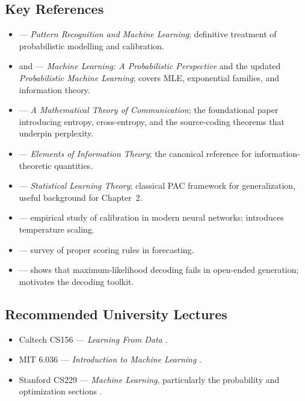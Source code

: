 \subsection{Key References}

\begin{itemize}
  \item \citet{bishop2006prml} --- \emph{Pattern Recognition and Machine Learning}; definitive treatment of probabilistic modelling and calibration.
  \item \citet{murphy2012mlpp} and \citet{murphy2022pml} --- \emph{Machine Learning: A Probabilistic Perspective} and the updated \emph{Probabilistic Machine Learning}; covers MLE, exponential families, and information theory.
  \item \citet{shannon1948} --- \emph{A Mathematical Theory of Communication}; the foundational paper introducing entropy, cross-entropy, and the source-coding theorems that underpin perplexity.
  \item \citet{cover2006elements} --- \emph{Elements of Information Theory}; the canonical reference for information-theoretic quantities.
  \item \citet{vapnik1998statistical} --- \emph{Statistical Learning Theory}; classical PAC framework for generalization, useful background for Chapter~2.
  \item \citet{guo2017calibration} --- empirical study of calibration in modern neural networks; introduces temperature scaling.
  \item \citet{gneiting2007strictly} --- survey of proper scoring rules in forecasting.
  \item \citet{holtzman2020curious} --- shows that maximum-likelihood decoding fails in open-ended generation; motivates the decoding toolkit.
\end{itemize}

\subsection{Recommended University Lectures}

\begin{itemize}
  \item Caltech CS156 --- \emph{Learning From Data} \citep{caltech_cs156}.
  \item MIT 6.036 --- \emph{Introduction to Machine Learning} \citep{mit_6036}.
  \item Stanford CS229 --- \emph{Machine Learning}, particularly the probability and optimization sections \citep{stanford_cs229}.
\end{itemize}

